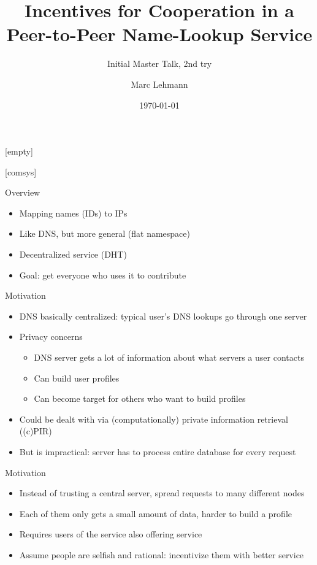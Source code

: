 \documentclass[presentation,english,usenames,dvipsnames]{beamer}
\title[Peer-to-Peer Incentives]{Incentives for Cooperation in a Peer-to-Peer
Name-Lookup Service}
\author{Marc Lehmann}
\subtitle{Initial Master Talk, 2nd try}
\date{\today}
\begin{document}
[empty]
\begin{frame}
  \titlepage
\end{frame}

[comsys]

\begin{frame}{Overview}
  \begin{itemize}
    \item Mapping names (IDs) to IPs
    \item Like DNS, but more general (flat namespace)
    \item Decentralized service (DHT)
    \item Goal: get everyone who uses it to contribute
  \end{itemize}
\end{frame}

\begin{frame}{Motivation}
  \begin{itemize}
    \item DNS basically centralized: typical user's DNS lookups go through one
          server
    \item Privacy concerns
    \begin{itemize}
      \item DNS server gets a lot of information about what servers a user
            contacts
      \item Can build user profiles
      \item Can become target for others who want to build profiles
    \end{itemize}
    \item Could be dealt with via (computationally) private information
          retrieval ((c)PIR)
    \item But is impractical: server has to process entire database for every
          request
  \end{itemize}
\end{frame}

\begin{frame}{Motivation}
  \begin{itemize}
    \item Instead of trusting a central server, spread requests to many
          different nodes
    \item Each of them only gets a small amount of data, harder to build a
          profile
    \item Requires users of the service also offering service
    \item Assume people are selfish and rational: incentivize them with better
          service
  \end{itemize}
\end{frame}
\end{document}
